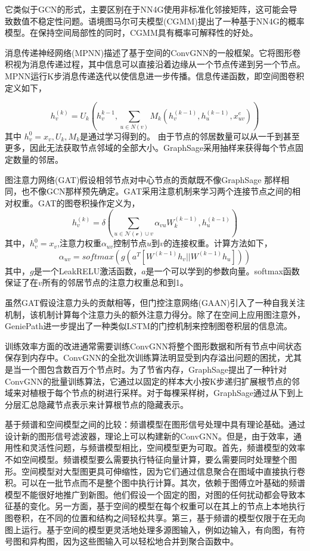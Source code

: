 它类似于GCN的形式，主要区别在于NN4G使用非标准化邻接矩阵，这可能会导致数值不稳定性问题。语境图马尔可夫模型(CGMM)提出了一种基于NN4G的概率模型。在保持空间局部性的同时，CGMM具有概率可解释性的好处。

消息传递神经网络(MPNN)描述了基于空间的ConvGNN的一般框架。它将图形卷积视为消息传递过程，其中信息可以直接沿着边缘从一个节点传递到另一个节点。MPNN运行K步消息传递迭代以使信息进一步传播。信息传递函数，即空间图卷积定义如下，

\[
h_v^{(k)}=U_k(h_v^{k-1},\sum_{u\in N(v)}M_k(h_v^{(k-1)},h_u^{(k-1)},x_{uv}^e))
\]
其中 $h_v^0=x_v,U_k,M_k$是通过学习得到的。
由于节点的邻居数量可以从一千到甚至更多，因此无法获取节点邻域的全部大小。GraphSage采用抽样来获得每个节点固定数量的邻居。

图注意力网络(GAT)假设相邻节点对中心节点的贡献既不像GraphSage 那样相同，也不像GCN那样预先确定。GAT采用注意机制来学习两个连接节点之间的相对权重。GAT的图卷积操作定义为，
\[
h_v^{(k)}=\delta(\sum_{u\in \mathcal{N(v)}\cup v}\alpha_{vu}W_k^{(k-1)},h_u^{(k-1)})
\]
其中，$h_v^0=x_v$,注意力权重$\alpha_{uv}$控制节点$u$到$v$的连接权重。计算方法如下，
\[
\alpha_{uv} = softmax(g(a^T[W^{(k-1)}h_v||W^{(k-1)}h_u]))
\]
其中，$g$是一个LeakRELU激活函数，$a$是一个可以学到的参数向量。softmax函数保证了在$v$所有的邻居节点的注意力权重总和到1。

虽然GAT假设注意力头的贡献相等，但门控注意网络(GAAN)引入了一种自我关注机制，该机制计算每个注意力头的额外注意力得分。除了在空间上应用图注意外，GeniePath进一步提出了一种类似LSTM的门控机制来控制图卷积层的信息流。

训练效率方面的改进通常需要训练ConvGNN将整个图形数据和所有节点中间状态保存到内存中。ConvGNN的全批次训练算法明显受到内存溢出问题的困扰，尤其是当一个图包含数百万个节点时。为了节省内存，GraphSage提出了一种针对ConvGNN的批量训练算法，它通过以固定的样本大小按K步递归扩展根节点的邻域来对植根于每个节点的树进行采样。对于每棵采样树，GraphSage通过从下到上分层汇总隐藏节点表示来计算根节点的隐藏表示。

基于频谱和空间模型之间的比较：频谱模型在图形信号处理中具有理论基础。通过设计新的图形信号滤波器，理论上可以构建新的ConvGNN。但是，由于效率，通用性和灵活性问题，与频谱模型相比，空间模型更为可取。首先，频谱模型的效率不如空间模型。频谱模型要么需要执行特征向量计算，要么需要同时处理整个图形。空间模型对大型图更具可伸缩性，因为它们通过信息聚合在图域中直接执行卷积。可以在一批节点而不是整个图中执行计算。其次，依赖于图傅立叶基础的频谱模型不能很好地推广到新图。他们假设一个固定的图，对图的任何扰动都会导致本征基的变化。另一方面，基于空间的模型在每个权重可以在其上的节点上本地执行图卷积，在不同的位置和结构之间轻松共享。第三，基于频谱的模型仅限于在无向图上运行。基于空间的模型更灵活地处理多源图输入，例如边输入，有向图，有符号图和异构图，因为这些图输入可以轻松地合并到聚合函数中。


